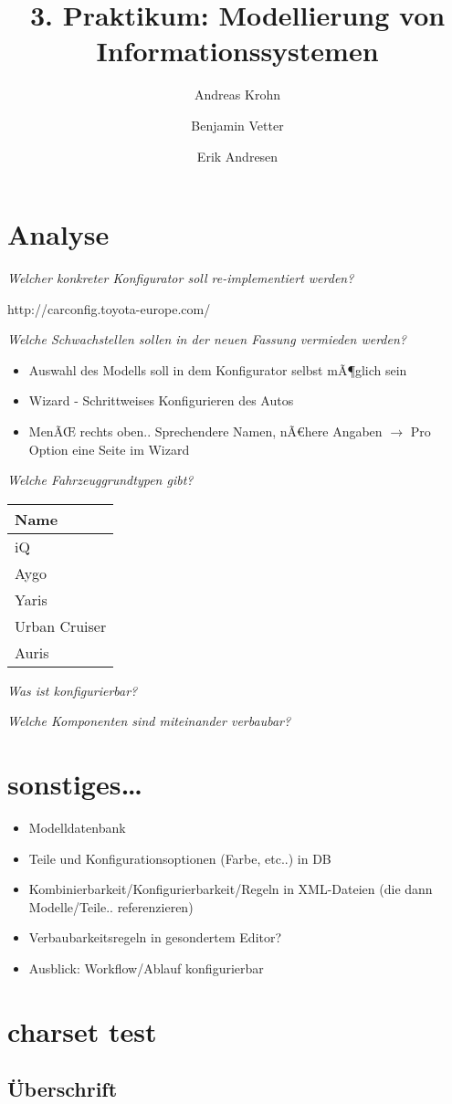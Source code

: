 \documentclass[a4paper,10pt]{article}
\title{3. Praktikum: Modellierung von Informationssystemen}
\author{Andreas Krohn \and Benjamin Vetter \and Erik Andresen}
\begin{document}
\maketitle

\tableofcontents

\section{Analyse}
\emph{Welcher konkreter Konfigurator soll re-implementiert werden?}

http://carconfig.toyota-europe.com/

\emph{Welche Schwachstellen sollen in der neuen Fassung vermieden werden?}

\begin{itemize}
 \item Auswahl des Modells soll in dem Konfigurator selbst mÃ¶glich sein
 \item Wizard - Schrittweises Konfigurieren des Autos
 \item MenÃŒ rechts oben.. Sprechendere Namen, nÃ€here Angaben $\rightarrow$ Pro Option eine Seite im Wizard
\end{itemize}

\emph{Welche Fahrzeuggrundtypen gibt?}

\begin{tabular}{|l|}
\hline
Name \\
\hline
iQ \\
Aygo \\
Yaris \\
Urban Cruiser \\
Auris\\
\hline
\end{tabular}

\emph{Was ist konfigurierbar?}

\emph{Welche Komponenten sind miteinander verbaubar?}



\section{sonstiges\ldots}
\begin{itemize}
 \item Modelldatenbank
 \item Teile und Konfigurationsoptionen (Farbe, etc..) in DB
 \item Kombinierbarkeit/Konfigurierbarkeit/Regeln in XML-Dateien (die dann Modelle/Teile.. referenzieren)
 \item Verbaubarkeitsregeln in gesondertem Editor?
 \item Ausblick: Workflow/Ablauf konfigurierbar
\end{itemize}

\section{charset test}
\subsection{Überschrift}
\end{document}
